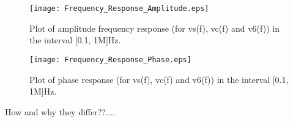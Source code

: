 \begin{figure}[h] \centering
\texttt{[image: Frequency\_Response\_Amplitude.eps]}
\caption{Plot of amplitude frequency response (for vs(f), vc(f) and v6(f)) in the interval [0.1, 1M]Hz.}
\label{fig:plotA(61)}
\end{figure}

\begin{figure}[h] \centering
\texttt{[image: Frequency\_Response\_Phase.eps]}
\caption{Plot of phase response (for vs(f), vc(f) and v6(f)) in the interval [0.1, 1M]Hz.}
\label{fig:plotA(62)}
\end{figure}

How and why they differ??....

